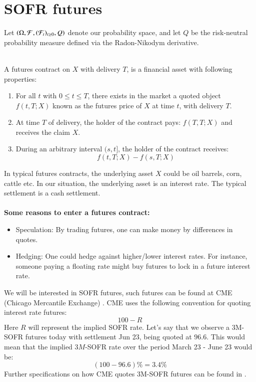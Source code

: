 \section{SOFR futures}
Let $(\Omega, \mathcal{F}, (\mathcal{F}_{t})_{t\geq 0}, Q)$ denote our probability space, and let $Q$ be the risk-neutral probability measure defined via the Radon-Nikodym derivative.
\\~\\
\begin{definition}
A futures contract on $X$ with delivery $T$, is a financial asset with following properties: 
\begin{enumerate}[leftmargin =*]
    \item For all $t$ with $0\leq t \leq T$, there exists in the market a quoted object $f(t,T;X)$ known as the futures price of $X$ at time $t$, with delivery $T$. 
    \item At time $T$ of delivery, the holder of the contract pays: $f(T,T;X)$ and receives the claim $X$.
    \item During an arbitrary interval $(s,t]$, the holder of the contract receives: 
    \[
    f(t,T;X) - f(s,T;X)
    \]
\end{enumerate}
\end{definition}

In typical futures contracts, the underlying asset  
$X$ could be oil barrels, corn, cattle etc. In our situation, the underlying asset is an interest rate. The typical settlement is a cash settlement. 
\\~\\ 
\textbf{Some reasons to enter a futures contract:}
\begin{itemize}
    \item Speculation: By trading futures, one can make money by differences in quotes.  
    \item Hedging: One could hedge against higher/lower interest rates. For instance, someone paying a floating rate might buy futures to lock in a future interest rate. 
\end{itemize}



We will be interested in SOFR futures, such futures can be found at CME (Chicago Mercantile Exchange) . CME uses the following convention for quoting interest rate futures: 
\[
100 - R
\]
Here $R$ will represent the implied SOFR rate. Let's say that we observe a 3M-SOFR futures today with settlement Jun 23, being quoted at $96.6$. This would mean that the implied $3M$-SOFR rate over the period March 23 - June 23 would be: 
\[
(100-96.6)\% = 3.4\% 
\] 
Further specifications on how CME quotes 3M-SOFR futures can be found in  \cite{cmegroup-sofr-futures}. 






